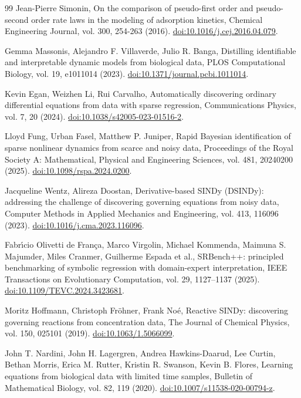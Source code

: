 \begin{thebibliography}{99}
 Jean-Pierre Simonin, On the comparison of pseudo-first order and pseudo-second order rate laws in the modeling of adsorption kinetics, Chemical Engineering Journal, vol. 300, 254-263 (2016). \href{https://doi.org/10.1016/j.cej.2016.04.079}{doi:10.1016/j.cej.2016.04.079}.

 Gemma Massonis, Alejandro F. Villaverde, Julio R. Banga, Distilling identifiable and interpretable dynamic models from biological data, PLOS Computational Biology, vol. 19, e1011014 (2023). \href{https://doi.org/10.1371/journal.pcbi.1011014}{doi:10.1371/journal.pcbi.1011014}.

 Kevin Egan, Weizhen Li, Rui Carvalho, Automatically discovering ordinary differential equations from data with sparse regression, Communications Physics, vol. 7, 20 (2024). \href{https://doi.org/10.1038/s42005-023-01516-2}{doi:10.1038/s42005-023-01516-2}.

 Lloyd Fung, Urban Fasel, Matthew P. Juniper, Rapid Bayesian identification of sparse nonlinear dynamics from scarce and noisy data, Proceedings of the Royal Society A: Mathematical, Physical and Engineering Sciences, vol. 481, 20240200 (2025). \href{https://doi.org/10.1098/rspa.2024.0200}{doi:10.1098/rspa.2024.0200}.

 Jacqueline Wentz, Alireza Doostan, Derivative-based SINDy (DSINDy): addressing the challenge of discovering governing equations from noisy data, Computer Methods in Applied Mechanics and Engineering, vol. 413, 116096 (2023). \href{https://doi.org/10.1016/j.cma.2023.116096}{doi:10.1016/j.cma.2023.116096}.

 Fabr\'{\i}cio Olivetti de Fran\c{c}a, Marco Virgolin, Michael Kommenda, Maimuna S. Majumder, Miles Cranmer, Guilherme Espada et al., SRBench++: principled benchmarking of symbolic regression with domain-expert interpretation, IEEE Transactions on Evolutionary Computation, vol. 29, 1127--1137 (2025). \href{https://doi.org/10.1109/TEVC.2024.3423681}{doi:10.1109/TEVC.2024.3423681}.

 Moritz Hoffmann, Christoph Fr\"ohner, Frank No\'e, Reactive SINDy: discovering governing reactions from concentration data, The Journal of Chemical Physics, vol. 150, 025101 (2019). \href{https://doi.org/10.1063/1.5066099}{doi:10.1063/1.5066099}.

 John T. Nardini, John H. Lagergren, Andrea Hawkins-Daarud, Lee Curtin, Bethan Morris, Erica M. Rutter, Kristin R. Swanson, Kevin B. Flores, Learning equations from biological data with limited time samples, Bulletin of Mathematical Biology, vol. 82, 119 (2020). \href{https://doi.org/10.1007/s11538-020-00794-z}{doi:10.1007/s11538-020-00794-z}.


\end{thebibliography}
